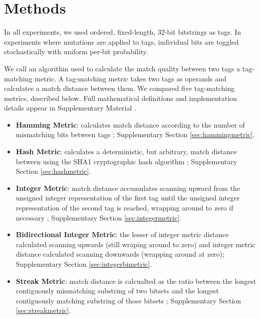\section{Methods}

In all experiments, we used ordered, fixed-length, 32-bit bitstrings as tags.
In experiments where mutations are applied to tags, individual bits are toggled stochastically with uniform per-bit probability.

We call an algorithm used to calculate the match quality between two tags a tag-matching metric.
A tag-matching metric takes two tags as operands and calculates a match distance between them.
We compared five tag-matching metrics, described below.
Full mathematical definitions and implementation details appear in Supplementary Material \citep{TODOSUPPLEMENT}.

\begin{itemize}
  \item \textbf{Hamming Metric}: calculates match distance according to the number of mismatching bits between tags \citep{lalejini2019else, hamming1950error}; Supplementary Section \ref{sec:hammingmetric}.
  \item \textbf{Hash Metric}: calculates a deterministic, but arbitrary, match distance between using the SHA1 cryptographic hash algorithm \citep{eastlake2001us}; Supplementary Section \ref{sec:hashmetric}.
  \item \textbf{Integer Metric}: match distance accumulates scanning upward from the unsigned integer representation of the first tag until the unsigned integer representation of the second tag is reached, wrapping around to zero if necessary \citep{spector2011tag}; Supplementary Section \ref{sec:integermetric}.
  \item \textbf{Bidirectional Integer Metric}: the lesser of integer metric distance calculated scanning upwards (still wraping around to zero) and integer metric distance calculated scanning downwards (wrapping around at zero); Supplementary Section \ref{sec:integerbimetric}.
  \item \textbf{Streak Metric}: match distance is calcualted as the ratio between the longest contiguously mismatching substring of two bitsets and the longest contiguously matching substring of those bitsets \citep{sec:downing2015intelligence}; Supplementary Section \ref{sec:streakmetric}.
\end{itemize}


